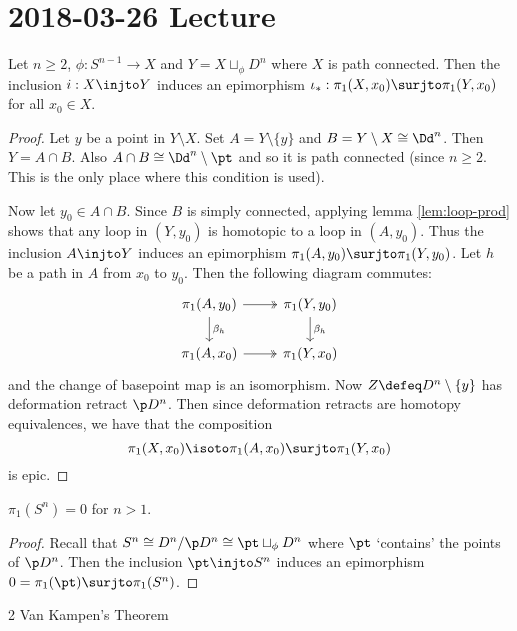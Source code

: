 \section{2018-03-26 Lecture}

\begin{cor}\label{7:cell}
	Let $n \geq 2$, $\phi:S^{n-1} \to X$ and $Y = X \sqcup_\phi D^n$ where $X$ is path connected.
	Then the inclusion $i:X \injto Y$ induces an epimorphism $\iota_*: \pi_1(X,x_0) \surjto \pi_1(Y,x_0)$ for all $x_0 \in X$.
\end{cor}

\begin{proof}
	Let $y$ be a point in $Y \setminus X$.
	Set $A = Y \setminus \{y\}$ and $B = Y \setminus X \cong \Dd^n$.
	Then $Y = A \cap B$.
	Also $A \cap B \cong \Dd^n \setminus \pt$ and so it is path connected (since $n \geq 2$.
	This is the only place where this condition is used).
	
	Now let $y_0 \in A \cap B$.
	Since $B$ is simply connected, applying lemma \ref{lem:loop-prod} shows that any loop in $(Y,y_0)$ is homotopic to a loop in $(A,y_0)$.
	Thus the inclusion $A \injto Y$ induces an epimorphism $\pi_1(A,y_0) \surjto \pi_1(Y,y_0)$.
	Let $h$ be a path in $A$ from $x_0$ to $y_0$.
	Then the following diagram commutes:
	\[
	\begin{tikzcd}
		\pi_1(A,y_0) \ar[r, twoheadrightarrow] \ar[d, "\beta_h"] & \pi_1(Y,y_0) \ar[d, "\beta_h"] \\
		\pi_1(A,x_0) \ar[r, twoheadrightarrow] & \pi_1(Y,x_0)
	\end{tikzcd}
	\]
	and the change of basepoint map is an isomorphism.
	Now $Z \defeq D^n \setminus \{y\}$ has deformation retract $\p D^n$.
	Then since deformation retracts are homotopy equivalences, we have that the composition
	\[\pi_1(X,x_0) \isoto \pi_1(A,x_0) \surjto \pi_1(Y,x_0)\]
	is epic.
\end{proof}

\begin{prop}
	$\pi_1(S^n)=0$ for $n>1$.
\end{prop}

\begin{proof}
	Recall that $S^n \cong D^n/\p D^n \cong \pt \sqcup_\phi D^n$ where $\pt$ `contains' the points of $\p D^n$.
	Then the inclusion $\pt \injto S^n$ induces an epimorphism $0=\pi_1(\pt) \surjto \pi_1(S^n)$.
\end{proof}

2 Van Kampen's Theorem

